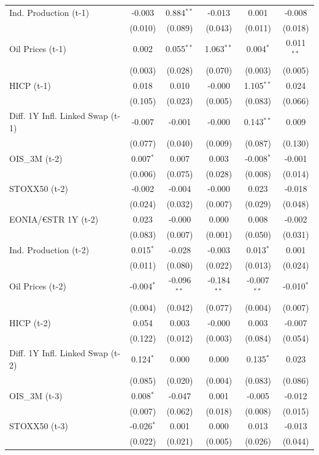 \begin{longtable}[t]{lccccc}
Ind. Production (t-1) & -0.003 & 0.884$^{**}$ & -0.013 & 0.001 & -0.008\\
 & (0.010) & (0.089) & (0.043) & (0.011) & (0.018)\\
Oil Prices (t-1) & 0.002 & 0.055$^{**}$ & 1.063$^{**}$ & 0.004$^{*}$ & 0.011$^{**}$\\
 & (0.003) & (0.028) & (0.070) & (0.003) & (0.005)\\
HICP (t-1) & 0.018 & 0.010 & -0.000 & 1.105$^{**}$ & 0.024\\
 & (0.105) & (0.023) & (0.005) & (0.083) & (0.066)\\
Diff. 1Y Infl. Linked Swap (t-1) & -0.007 & -0.001 & -0.000 & 0.143$^{**}$ & 0.009\\
 & (0.077) & (0.040) & (0.009) & (0.087) & (0.130)\\
OIS\_3M (t-2) & 0.007$^{*}$ & 0.007 & 0.003 & -0.008$^{*}$ & -0.001\\
 & (0.006) & (0.075) & (0.028) & (0.008) & (0.014)\\
STOXX50 (t-2) & -0.002 & -0.004 & -0.000 & 0.023 & -0.018\\
 & (0.024) & (0.032) & (0.007) & (0.029) & (0.048)\\
EONIA/€STR 1Y (t-2) & 0.023 & -0.000 & 0.000 & 0.008 & -0.002\\
 & (0.083) & (0.007) & (0.001) & (0.050) & (0.031)\\
Ind. Production (t-2) & 0.015$^{*}$ & -0.028 & -0.003 & 0.013$^{*}$ & 0.001\\
 & (0.011) & (0.080) & (0.022) & (0.013) & (0.024)\\
Oil Prices (t-2) & -0.004$^{*}$ & -0.096$^{**}$ & -0.184$^{**}$ & -0.007$^{**}$ & -0.010$^{*}$\\
 & (0.004) & (0.042) & (0.077) & (0.004) & (0.007)\\
HICP (t-2) & 0.054 & 0.003 & -0.000 & 0.003 & -0.007\\
 & (0.122) & (0.012) & (0.003) & (0.084) & (0.054)\\
Diff. 1Y Infl. Linked Swap (t-2) & 0.124$^{*}$ & 0.000 & 0.000 & 0.135$^{*}$ & 0.023\\
 & (0.085) & (0.020) & (0.004) & (0.083) & (0.086)\\
OIS\_3M (t-3) & 0.008$^{*}$ & -0.047 & 0.001 & -0.005 & -0.012\\
 & (0.007) & (0.062) & (0.018) & (0.008) & (0.015)\\
STOXX50 (t-3) & -0.026$^{*}$ & 0.001 & 0.000 & 0.013 & -0.013\\
 & (0.022) & (0.021) & (0.005) & (0.026) & (0.044)\\

\end{longtable}
